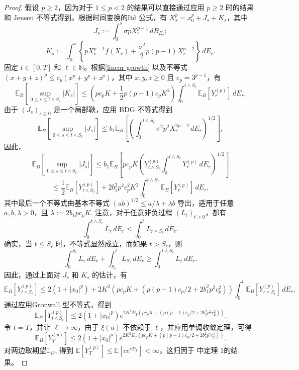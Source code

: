 \begin{proof}
	假设 $p \geq 2$，因为对于 $1 \leq p < 2$ 的结果可以直接通过应用 $p \geq 2$ 时的结果和 Jensen 不等式得到。根据时间变换的Itô 公式，有 $X_s^p = x_0^p + J_s + K_s$，其中
	\[
	J_s := \int_0^s \sigma p X_r^{p-1}  \, dB_{E_r};
	\]
	\[
	K_s := \int_0^s \left\{ p X_r^{p-1} f(X_r) + \frac{\sigma^2}{2} p (p-1) X_r^{p-2}  \right\} \, dE_r.
	\]
	固定 $t \in [0, T]$ 和 $\ell \in \mathbb{N}$。根据\cref{linear growth} 以及不等式 $(x + y + z)^p \leq c_p (x^p + y^p + z^p)$，其中 $x, y, z \geq 0$ 且 $c_p = 3^{p-1}$，有
	\[
	\mathbb{E}_B\left[ \sup_{0 \leq s \leq t \wedge S_{\ell}} |K_s| \right] \leq \left( p c_p K + \frac{1}{2} p(p-1) c_p K^2 \right) \int_0^{t \wedge S_{\ell}} \mathbb{E}_B[Y_r^{(p)}] \, dE_r.
	\]
	由于 $(J_s)_{s \geq 0}$ 是一个局部鞅，应用 BDG 不等式得到
	\[
	\mathbb{E}_B\left[\sup_{0 \leq s \leq t \wedge S_{\ell}} |J_s| \right] \leq b_1 \mathbb{E}_B \left[\left( \int_0^{t \wedge S_{\ell}} \sigma^2 p^2 X_r^{2p-2}  \, dE_r \right)^{1/2}\right],
	\]
	因此，
	\[
	\mathbb{E}_B \left[\sup_{0 \leq s \leq t \wedge S_{\ell}} |J_s| \right] \leq b_1 \mathbb{E}_B \left[ p c_p K \left( Y_{t \wedge S_{\ell}}^{(p)} \int_0^{t \wedge S_{\ell}} Y_r^{(p)} \, dE_r \right)^{1/2} \right]
	\]
	\[
	\leq \frac{1}{2} \mathbb{E}_B \left[Y_{t \wedge S_{\ell}}^{(p)}\right] + 2b_1^2 p^2 c_p^2 K^2 \int_0^{t \wedge S_{\ell}} \mathbb{E}_B \left[Y_r^{(p)}\right] \, dE_r,
	\]
	其中最后一个不等式由基本不等式 $(ab)^{1/2} \leq a/\lambda + \lambda b$ 导出，适用于任意 $a, b, \lambda > 0$，且 $\lambda := 2b_1 p c_p K$. 
	注意，对于任意非负过程 $(L_t)_{t \geq 0}$，都有
	\[
	\int_0^{t \wedge S_{\ell}} L_r \, dE_r \leq \int_0^t L_{r \wedge S_{\ell}} \, dE_r.
	\]
	确实，当 $t \leq S_{\ell}$ 时，不等式显然成立，而如果 $t > S_{\ell}$，则
	\[
	\int_0^{S_{\ell}} L_r \, dE_r + \int_{S_{\ell}}^t L_{S_{\ell}} \, dE_r \geq \int_0^{t \wedge S_{\ell}} L_r \, dE_r.
	\]
	因此，通过上面对 $J_s$ 和 $K_s$ 的估计，有
	\[
	\mathbb{E}_B[Y_{t \wedge S_{\ell}}^{(p)}] \leq 2(1 + |x_0|^p) + 2K^2\left(p c_p K + \left(p(p-1) c_p / 2 + 2b_1^2 p^2 c_p^2\right) \right)\int_0^t \mathbb{E}_B[Y_{r \wedge S_{\ell}}^{(p)}] \, dE_r,
	\]
	通过应用Gronwall 型不等式，得到
	\[
	\mathbb{E}_B[Y_{t \wedge S_{\ell}}^{(p)}] \leq 2(1 + |x_0|^p) e^{2K^2E_T\left(p c_p K + \left(p(p-1) c_p / 2 + 2b_1^2 p^2 c_p^2\right) \right) }.
	\]
	令 $t = T$，并让 $\ell \to \infty$，由于 $\xi(u)$ 不依赖于 $\ell$，并应用单调收敛定理，可得
	\[
	\mathbb{E}_B[Y_T^{(p)}] \leq 2(1 + |x_0|^p) e^{2K^2E_T \left(p c_p K + \left(p(p-1) c_p / 2 + 2b_1^2 p^2 c_p^2\right) \right)}. 
	\]
	对两边取期望$\mathbb{E}_D$, 得到 $\mathbb{E}[Y_T^{(p)}] \leq \mathbb{E}[ce^{cE_T}] < \infty$，这归因于 \cite{jin2019strong}中定理 1的结果。
	
\end{proof}

